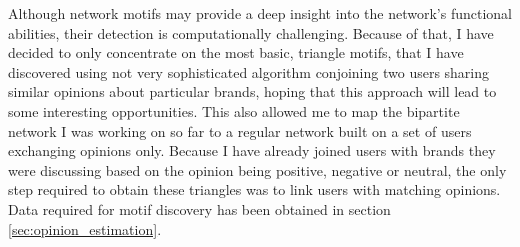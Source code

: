       Although network motifs may provide a deep insight into the network's functional abilities, their detection is computationally challenging. Because of that, I have decided to only concentrate on the most basic, triangle motifs, that I have discovered using not very sophisticated algorithm conjoining two users sharing similar opinions about particular brands, hoping that this approach will lead to some interesting opportunities. This also allowed me to map the bipartite network I was working on so far to a regular network built on a set of users exchanging opinions only. Because I have already joined users with brands they were discussing based on the opinion being positive, negative or neutral, the only step required to obtain these triangles was to link users with matching opinions. Data required for motif discovery has been obtained in section \ref{sec:opinion_estimation}.
      
